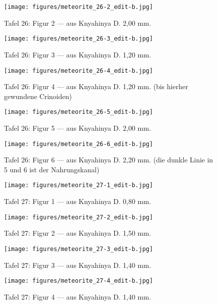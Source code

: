 \documentclass[a4paper, 12pt, oneside]{article}
\begin{document}
\clearpage
\begin{figure}[t]
\texttt{[image: figures/meteorite\_26-2\_edit-b.jpg]}
\caption{Tafel 26: Figur 2 --- aus Knyahinya D. 2,00 mm.}
\centering
\end{figure}
\clearpage
\begin{figure}[t]
\texttt{[image: figures/meteorite\_26-3\_edit-b.jpg]}
\caption{Tafel 26: Figur 3 --- aus Knyahinya D. 1,20 mm.}
\centering
\end{figure}
\clearpage
\begin{figure}[t]
\texttt{[image: figures/meteorite\_26-4\_edit-b.jpg]}
\caption{Tafel 26: Figur 4 --- aus Knyahinya D. 1,20 mm. (bis hierher gewundene Crinoiden)}
\centering
\end{figure}
\clearpage
\begin{figure}[t]
\texttt{[image: figures/meteorite\_26-5\_edit-b.jpg]}
\caption{Tafel 26: Figur 5 --- aus Knyahinya D. 2,00 mm.}
\centering
\end{figure}
\clearpage
\begin{figure}[t]
\texttt{[image: figures/meteorite\_26-6\_edit-b.jpg]}
\caption{Tafel 26: Figur 6 --- aus Knyahinya D. 2,20 mm. (die dunkle Linie in 5 und 6 ist der Nahrungskanal)}
\centering
\end{figure}
\clearpage
{}
\begin{figure}[t]
\texttt{[image: figures/meteorite\_27-1\_edit-b.jpg]}
\caption{Tafel 27: Figur 1 --- aus Knyahinya D. 0,80 mm.}
\centering
\end{figure}
\clearpage
\begin{figure}[t]
\texttt{[image: figures/meteorite\_27-2\_edit-b.jpg]}
\caption{Tafel 27: Figur 2 --- aus Knyahinya D. 1,50 mm.}
\centering
\end{figure}
\clearpage
\begin{figure}[t]
\texttt{[image: figures/meteorite\_27-3\_edit-b.jpg]}
\caption{Tafel 27: Figur 3 --- aus Knyahinya D. 1,40 mm.}
\centering
\end{figure}
\clearpage
\begin{figure}[t]
\texttt{[image: figures/meteorite\_27-4\_edit-b.jpg]}
\caption{Tafel 27: Figur 4 --- aus Knyahinya D. 1,40 mm.}
\centering
\end{figure}
\end{document}
